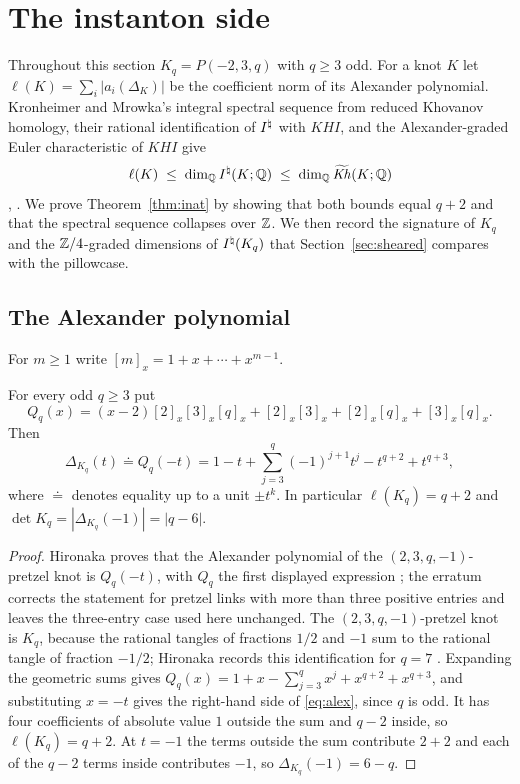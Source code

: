 \section{The instanton side}\label{sec:inat}

Throughout this section $K_q=P(-2,3,q)$ with $q\ge3$ odd. For a knot $K$ let
$\ell(K)=\sum_i|a_i(\Delta_K)|$ be the coefficient norm of its Alexander polynomial. Kronheimer and
Mrowka's integral spectral sequence from reduced Khovanov homology, their rational identification of
$I^{\natural}$ with $KHI$, and the Alexander-graded Euler characteristic of $KHI$ give
\begin{equation}\label{eq:ell}
   \ell(K)\;\le\;\dim_{\mathbb{Q}}I^{\natural}(K;\mathbb{Q})\;\le\;\dim_{\mathbb{Q}}\widetilde{\mathit{Kh}}(K;\mathbb{Q})
\end{equation}
\cite[Props.~1.2 and 1.4]{KM2}, \cite[Thm.~1.1 and Cor.~1.2]{KMAlex}. We prove
Theorem~\ref{thm:inat} by showing that both bounds equal $q+2$ and that the spectral sequence
collapses over $\mathbb{Z}$. We then record the signature of $K_q$ and the $\mathbb{Z}/4$-graded dimensions of
$I^{\natural}(K_q)$ that Section~\ref{sec:sheared} compares with the pillowcase.

\subsection{The Alexander polynomial}\label{ss:alex}
For $m\ge1$ write $[m]_x=1+x+\cdots+x^{m-1}$.

\begin{lemma}\label{lem:alex}
For every odd $q\ge3$ put
\[
 Q_q(x)=(x-2)[2]_x[3]_x[q]_x+[2]_x[3]_x+[2]_x[q]_x+[3]_x[q]_x .
\]
Then
\begin{equation}\label{eq:alex}
 \Delta_{K_q}(t)\doteq Q_q(-t)=1-t+\sum_{j=3}^{q}(-1)^{j+1}t^j-t^{q+2}+t^{q+3},
\end{equation}
where $\doteq$ denotes equality up to a unit $\pm t^k$. In particular $\ell(K_q)=q+2$ and
$\det K_q=|\Delta_{K_q}(-1)|=|q-6|$.
\end{lemma}

\begin{proof}
Hironaka proves that the Alexander polynomial of the $(2,3,q,-1)$-pretzel knot is $Q_q(-t)$, with
$Q_q$ the first displayed expression \cite[Thm.~1.2]{Hironaka}; the erratum \cite{HironakaErr}
corrects the statement for pretzel links with more than three positive entries and leaves the
three-entry case used here unchanged. The $(2,3,q,-1)$-pretzel knot is $K_q$, because the rational
tangles of fractions $1/2$ and $-1$ sum to the rational tangle of fraction $-1/2$; Hironaka records
this identification for $q=7$ \cite[p.~442]{Hironaka}. Expanding the geometric sums gives
$Q_q(x)=1+x-\sum_{j=3}^{q}x^j+x^{q+2}+x^{q+3}$, and substituting $x=-t$ gives the right-hand side of
\eqref{eq:alex}, since $q$ is odd. It has four coefficients of absolute value $1$ outside the sum
and $q-2$ inside, so $\ell(K_q)=q+2$. At $t=-1$ the terms outside the sum contribute $2+2$ and each of
the $q-2$ terms inside contributes $-1$, so $\Delta_{K_q}(-1)=6-q$.
\end{proof}

